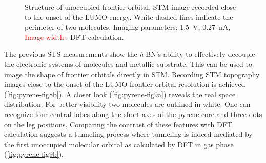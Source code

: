 \begin{figure}[] \centering
	\caption{Structure of unoccupied frontier orbital.  STM image recorded close to the onset of the LUMO energy. White dashed lines indicate the perimeter of two molecules. Imaging parameters: \SI{1.5}{\volt}, \SI{0.27}{\nano \ampere}, \textcolor{red}{Image width:}.  DFT-calculation.
	}
	\label{fig:pyrene-fig9}
\end{figure}

The previous STS measurements show the \textit{h}-BN’s ability to effectively decouple the electronic systems of molecules and metallic substrate. This can be used to image the shape of frontier orbitals directly in STM. Recording STM topography images close to the onset of the LUMO frontier orbital resolution is achieved (\autoref{fig:pyrene-fig8b}). A closer look (\autoref{fig:pyrene-fig9a}) reveals the real space distribution. For better visibility two molecules are outlined in white. One can recognize four central lobes along the short axes of the pyrene core and three dots on the leg positions. Comparing the contrast of these features with DFT calculation suggests a tunneling process where tunneling is indeed mediated by the first unoccupied molecular orbital as calculated by DFT in gas phase (\autoref{fig:pyrene-fig9b}).


